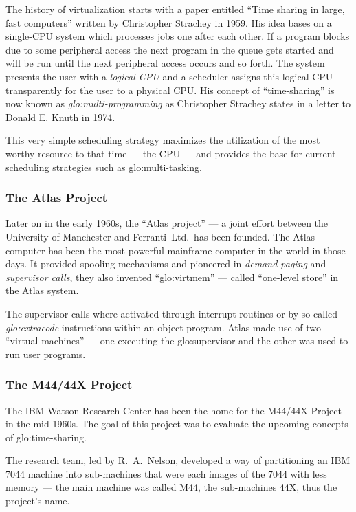 The history of virtualization starts  with a paper entitled ``Time sharing
in  large,  fast  computers''  \cite{Strachey59}  written  by  Christopher
Strachey in  1959. His idea bases  on a single-CPU  system which processes
jobs one  after each  other. If  a program blocks  due to  some peripheral
access the  next program in the queue  gets started and will  be run until
the next peripheral  access occurs and so forth.   The system presents the
user with  a \emph{logical CPU} and  a scheduler assigns  this logical CPU
transparently  for   the  user  to   a  physical  CPU.   His   concept  of
``time-sharing''  is now  known  as \emph{\gls{glo:multi-programming}}  as
Christopher Strachey states in a letter to Donald E. Knuth in 1974.

This very simple scheduling strategy maximizes the utilization of the most
worthy resource  to that time  --- the CPU  --- and provides the  base for
current scheduling strategies such as \gls{glo:multi-tasking}.

\subsubsection{The Atlas Project}

Later on  in the  early 1960s,  the ``Atlas project''  --- a  joint effort
between the  University of Manchester and  Ferranti~Ltd.~has been founded.
The Atlas  computer has been the  most powerful mainframe  computer in the
world in  those days.   It provided spooling  mechanisms and  pioneered in
\emph{demand  paging}  and  \emph{supervisor  calls}, they  also  invented
``\gls{glo:virtmem}'' --- called ``one-level store'' in
the Atlas system.

The  supervisor calls  where activated  through interrupt  routines  or by
so-called \emph{\gls{glo:extracode}}  instructions within an object
program.  Atlas made use of two ``virtual machines'' --- one executing the
\gls{glo:supervisor}  and   the  other   was  used  to   run  user
programs\cite{virtualization-overview}.

\subsubsection{The M44/44X Project}

The IBM Watson  Research Center has been the home  for the M44/44X Project
in the  mid 1960s. The goal of  this project was to  evaluate the upcoming
concepts of  \gls{glo:time-sharing}.

The research team, led by R.~A.~Nelson, developed a way of partitioning an
IBM 7044 machine into sub-machines that  were each images of the 7044 with
less memory  --- the  main machine was  called M44, the  sub-machines 44X,
thus the project's name\cite{virtualization-overview}.

